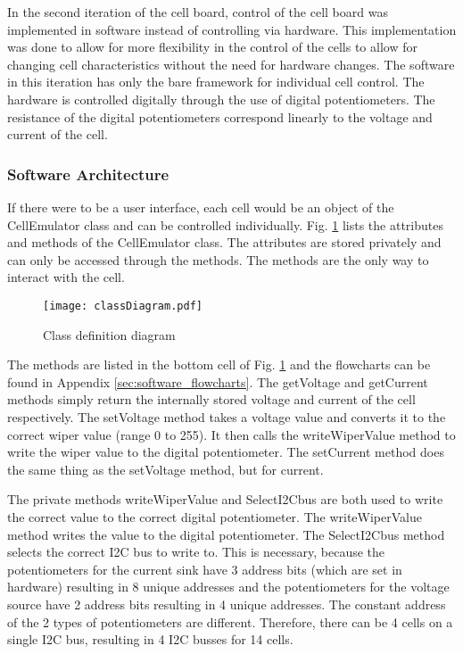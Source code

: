 In the second iteration of the cell board, control of the cell board was implemented in software instead of controlling via hardware.
This implementation was done to allow for more flexibility in the control of the cells to allow for changing cell characteristics without the need for hardware changes.
The software in this iteration has only the bare framework for individual cell control.
The hardware is controlled digitally through the use of digital potentiometers. The resistance of the digital potentiometers correspond linearly to the voltage and current of the cell.

\subsubsection{Software Architecture}
If there were to be a user interface, each cell would be an object of the CellEmulator class and can be controlled individually. Fig. \ref{fig:classDiagram} lists the attributes and methods of the CellEmulator class. The attributes are stored privately and can only be accessed through the methods. The methods are the only way to interact with the cell. 
\FloatBarrier
\begin{figure}[ht!]
    \centering
    \texttt{[image: classDiagram.pdf]}
    \caption{Class definition diagram}
    \label{fig:classDiagram}
\end{figure}
\FloatBarrier
The methods are listed in the bottom cell of Fig. \ref{fig:classDiagram} and the flowcharts can be found in Appendix \ref{sec:software_flowcharts}. The getVoltage and getCurrent methods simply return the internally stored voltage and current of the cell respectively. The setVoltage method takes a voltage value and converts it to the correct wiper value (range 0 to 255). It then calls the writeWiperValue method to write the wiper value to the digital potentiometer. The setCurrent method does the same thing as the setVoltage method, but for current.

The private methods writeWiperValue and SelectI2Cbus are both used to write the correct value to the correct digital potentiometer. The writeWiperValue method writes the value to the digital potentiometer. The SelectI2Cbus method selects the correct I2C bus to write to. 
This is necessary, because the potentiometers for the current sink have 3 address bits (which are set in hardware) resulting in 8 unique addresses and the potentiometers for the voltage source have 2 address bits resulting in 4 unique addresses. The constant address of the 2 types of potentiometers are different. Therefore, there can be 4 cells on a single I2C bus, resulting in 4 I2C busses for 14 cells. 
